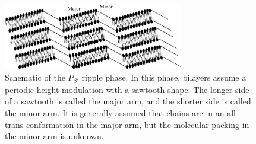 \begin{figure}[htbp]
  \centering
  \includegraphics[width=0.7\textwidth]{figures/ripple_cartoon}
  \caption{Schematic of the $P_{\beta'}$ ripple phase. In this phase, 
  bilayers assume a periodic height modulation with a sawtooth shape.
  The longer side of a sawtooth is called the major arm, and the shorter
  side is called the minor arm. It is generally assumed that chains are
  in an all-trans conformation in the major arm, but the molecular packing
  in the minor arm is unknown.}
  \label{fig:ripple_cartoon}
\end{figure}